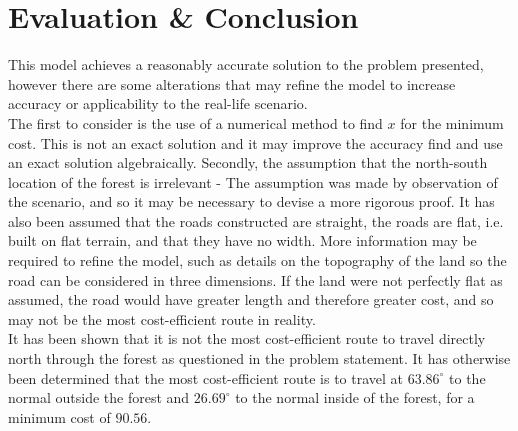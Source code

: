 \documentclass[12pt,a4paper]{article}
\begin{document}
\section*{Evaluation \& Conclusion}

This model achieves a reasonably accurate solution to the problem presented, however there are some alterations that may refine the model to increase accuracy or applicability to the real-life scenario.\\
\indent The first to consider is the use of a numerical method to find $x$ for the minimum cost. This is not an exact solution and it may improve the accuracy find and use an exact solution algebraically. Secondly, the assumption that the north-south location of the forest is irrelevant - The assumption was made by observation of the scenario, and so it may be necessary to devise a more rigorous proof. It has also been assumed that the roads constructed are straight, the roads are flat, i.e. built on flat terrain, and that they have no width. More information may be required to refine the model, such as details on the topography of the land so the road can be considered in three dimensions. If the land were not perfectly flat as assumed, the road would have greater length and therefore greater cost, and so may not be the most cost-efficient route in reality.\\
\indent It has been shown that it is not the most cost-efficient route to travel directly north through the forest as questioned in the problem statement. It has otherwise been determined that the most cost-efficient route is to travel at $63.86^{\circ}$ to the normal outside the forest and $26.69^{\circ}$ to the normal inside of the forest, for a minimum cost of $90.56$.



\clearpage
\printbibliography
\end{document}
